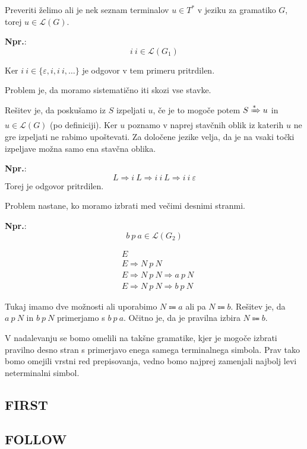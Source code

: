 \documentclass{article}
\newcommand{\Ex}{\textbf{Npr.}:\ }
\newcommand{\FIRST}{\textsc{FIRST}}
\newcommand{\FOLLOW}{\textsc{FOLLOW}}
\newcommand{\Grammar}{G}
\newcommand{\StartSymbol}{S}
\newcommand{\Null}{\varepsilon}
\newcommand{\Language}[1]{\mathcal{L}(#1)}
\newcommand{\Arrow}{\Coloneqq}
\newcommand{\Derive}{\Rightarrow}
\newcommand{\DeriveStar}{\xRightarrow{\ast}}
\newcommand{\Seq}{\ }
\newcommand{\Kleene}[1]{#1^\ast}
\begin{document}
Preveriti želimo ali je nek seznam terminalov $u \in \Kleene{T}$ v jeziku za gramatiko $\Grammar$, torej $u \in \Language{\Grammar}$.

\Ex
  \begin{equation*}
    i \Seq i \in \Language{\Grammar_1}
  \end{equation*}

  Ker $i \Seq i \in \{\Null, i, i \Seq i, \dots\}$ je odgovor v tem primeru pritrdilen.

Problem je, da moramo sistematično iti skozi vse stavke.

Rešitev je, da poskušamo iz $\StartSymbol$ izpeljati $u$, če je to mogoče potem $\StartSymbol \DeriveStar u$ in $u \in \Language{\Grammar}$ (po definiciji).
Ker $u$ poznamo v naprej stavčnih oblik iz katerih $u$ ne gre izpeljati ne rabimo upoštevati.
Za določene jezike velja, da je na vsaki točki izpeljave možna samo ena stavčna oblika.

\Ex
  \begin{equation*}
    L \Derive i \Seq L \Derive i \Seq i \Seq L \Derive i \Seq i \Seq \Null
  \end{equation*}
  Torej je odgovor pritrdilen.

Problem nastane, ko moramo izbrati med večimi desnimi stranmi.

\Ex
  \begin{equation*}
    b \Seq p \Seq a \in \Language{\Grammar_2}
  \end{equation*}

  \begin{align*}
    &E \\
    &E \Derive N \Seq p \Seq N \\
    &E \Derive N \Seq p \Seq N \Derive a \Seq p \Seq N\\
    &E \Derive N \Seq p \Seq N \Derive b \Seq p \Seq N
  \end{align*}

Tukaj imamo dve možnosti ali uporabimo $N \Arrow a$ ali pa $N \Arrow b$.
Rešitev je, da $a \Seq p \Seq N$ in $b \Seq p \Seq N$ primerjamo s $b \Seq p \Seq a$.
Očitno je, da je pravilna izbira $N \Arrow b$.

V nadalevanju se bomo omelili na takšne gramatike, kjer je mogoče izbrati pravilno desno stran s primerjavo enega samega terminalnega simbola.
Prav tako bomo omejili vrstni red prepisovanja, vedno bomo najprej zamenjali najbolj levi neterminalni simbol.

\subsection{\FIRST}


\subsection{\FOLLOW}


\printbibliography
\end{document}
